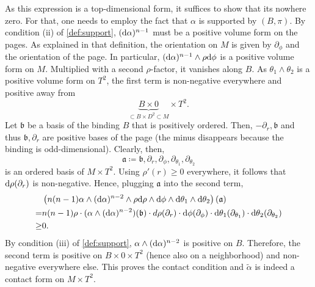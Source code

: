 As this expression is a top-dimensional form, it suffices to show that its nowhere zero.
For that, one needs to employ the fact that $\alpha$ is supported by $(B, \pi)$.
By condition (ii) of \cref{def:support}, $(\mathrm{d} \alpha)^{n-1}$ must be a positive volume form on the pages. 
As explained in that definition, the orientation on $M$ is given by $\partial_\phi$ and the orientation of the page. 
In particular, $(\mathrm{d} \alpha)^{n-1} \wedge \rho \mathrm{d} \phi$ is a positive volume form on $M$. 
Multiplied with a second $\rho$-factor, it vanishes along $B$. 
As $\theta_1 \wedge \theta_2$ is a positive volume form on $T^2$, the first term is non-negative everywhere and positive away from 
\[
    \underbrace{B \times 0}_{\subset B \times D^2 \subset M} \times T^2.
\]
Let $\mathfrak{b}$ be a basis of the binding $B$ that is positively ordered. 
Then, $- \partial_r, \mathfrak{b}$ and thus $\mathfrak{b}, \partial_r$ are positive bases of the page (the minus disappears because the binding is odd-dimensional). 
Clearly, then, 
\[ 
    \mathfrak{a} \coloneqq \mathfrak{b}, \partial_r, \partial_\phi, \partial_{\theta_1}, \partial_{\theta_2}
\] 
is an ordered basis of $M\times T^2$.
Using $\rho'(r) \geq 0$ everywhere, it follows that $\mathrm{d} \rho(\partial_r)$ is non-negative.
Hence, plugging $\mathfrak{a}$ into the second term,
\begin{align*}
    &\left(n(n-1)\alpha \wedge (\mathrm{d} \alpha)^{n-2}\wedge \rho \mathrm{d}\rho \wedge \mathrm{d} \phi \wedge \mathrm{d} \theta_1 \wedge \mathrm{d} \theta_2\right)(\mathfrak{a})\\
    =& n(n-1) \rho \cdot (\alpha \wedge (\mathrm{d} \alpha)^{n-2})(\mathfrak{b}) \cdot d\rho(\partial_r) \cdot \mathrm{d} \phi(\partial_\phi) \cdot \mathrm{d} \theta_1(\partial_{\theta_1}) \cdot \mathrm{d} \theta_2(\partial_{\theta_2})\\
    \geq& 0.
\end{align*}
By condition (iii) of \cref{def:support}, $\alpha \wedge (\mathrm{d} \alpha)^{n-2}$ is positive on $B$. 
Therefore, the second term is positive on $B \times 0 \times T^2$ (hence also on a neighborhood) and non-negative everywhere else.
This proves the contact condition and $\tilde \alpha$ is indeed a contact form on $M\times T^2$.
